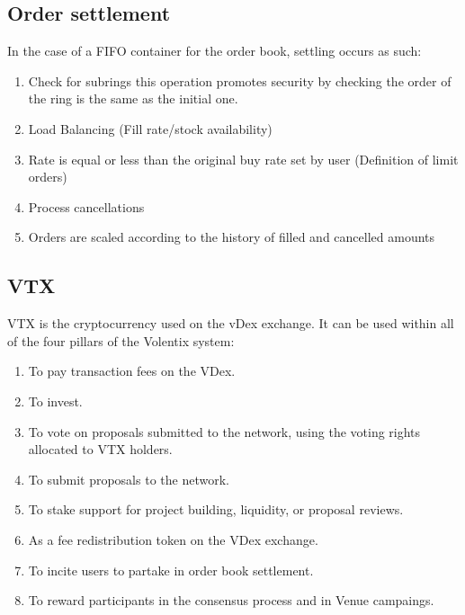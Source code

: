 \documentclass[]{article}
\begin{document}
\subsection{Order settlement}
In the case of a FIFO container for the order book,
settling occurs as such:
\begin{enumerate}
	\item Check for subrings
	this operation promotes security by checking the order of the ring is the same as the initial one.
	\item Load Balancing (Fill rate/stock availability)
	\item Rate is equal or less than the original buy rate set by user (Definition of limit orders)
	\item Process cancellations\\
	\item Orders are scaled according to the history of filled and cancelled amounts\\	 
\end{enumerate}	
	

\subsection{VTX}
VTX is the cryptocurrency used on the vDex exchange. 
It can be used within all of the four pillars of the Volentix system:
\begin{enumerate}
\item To pay transaction fees on the VDex.
\item To invest. 
\item To vote on proposals submitted to the network, using the voting rights allocated to VTX holders.
\item To submit proposals to the network.
\item To stake support for project building, liquidity, or proposal reviews. 
\item As a fee redistribution token on the VDex exchange.
\item To incite users to partake in order book settlement.
\item To reward participants in the consensus process and in Venue campaings.
\end{enumerate}
\end{document}
